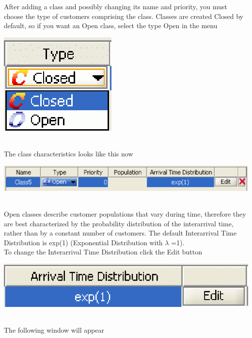After adding a class and possibly changing its name and priority, you must choose the type of customers comprising the class. Classes are created Closed by default, so if you want an Open class, select the type Open in the menu\\
\begin{center}
\includegraphics[scale=.5]{img/jsim/type_class.eps}
\end{center}\\
The class characteristics looks like this now
\begin{center}
\includegraphics[scale=.5]{img/jsim/open_class1.eps}
\end{center}\\
Open classes describe customer populations that vary during time, therefore they are best characterized by the probability distribution of the interarrival time, rather than by a constant number of customers. The default Interarrival Time Distribution is exp(1) (Exponential Distribution with $\lambda$ =1).\\ To change the Interarrival Time Distribution click the Edit button
\begin{center}
\includegraphics[scale=.5]{img/jsim/arrival_time_distribution1.eps}
\end{center}\\
The following window will appear\\
